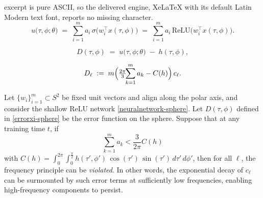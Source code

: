 \documentclass[10pt,a4paper]{amsart}
\begin{document}
excerpt is pure ASCII, so the delivered engine, XeLaTeX with its default Latin Modern text font, reports no missing character.
\begin{equation}\label{neuralnetwork-sphere}
u\bigl(\tau,\phi;\theta\bigr)
\;=\;
\sum_{i=1}^m 
a_i\,\sigma\bigl(w_i^\top x(\tau,\phi)\bigr)
\;=\;
\sum_{i=1}^m 
a_i\,\mathrm{ReLU}\bigl(w_i^\top x(\tau,\phi)\bigr).
\end{equation}

\begin{equation}\label{errorxi-sphere}
    D(\tau,\phi)
\;=\;
u\bigl(\tau,\phi;\theta\bigr)
\;-\;
h(\tau,\phi),
\end{equation}

\begin{equation}\label{D_ellfixed}
D_{\ell}
\;:=\;
m\Bigl(\tfrac{2\pi}{3}\!\!\sum_{k=1}^m a_k - C(h)\Bigr)\,c_{\ell}.
\end{equation}

\begin{theorem}
\label{thm:FPviolationSphere}
Let \(\{w_i\}_{i=1}^m \subset S^2\) be fixed unit vectors and align along the polar axis, and consider the shallow ReLU network \eqref{neuralnetwork-sphere}. Let \(D(\tau,\phi)\) defined in \eqref{errorxi-sphere} be the error function on the sphere.  
Suppose that at any training time $t$, if $$
\sum_{k=1}^m a_k < \frac{3}{2\pi}C(h)$$
with $C(h) = \int_{0}^{2\pi}\!\!\int_{0}^{\tfrac{\pi}{2}}
h(\tau',\phi')\,\cos(\tau')\,\sin(\tau')\,d\tau'\,d\phi'$, then for all \(\ell\), the frequency principle can be \emph{violated}.  
In other words, the exponential decay of \(c_{\ell}\) can be surmounted by such error terms at sufficiently low 
frequencies, enabling high-frequency components to persist.
\end{theorem}
\end{document}
